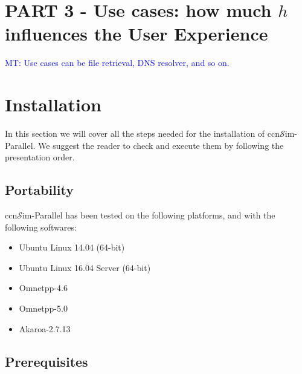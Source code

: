 \documentclass[10pt]{article}
\newcommand{\MT}[1]{\textcolor{blue}{MT: #1}}
\newcommand{\ccnsim}{ccn\ensuremath{\mathcal{S}}im} %
\begin{document}
\section*{PART 3 - Use cases: how much $h$ influences the User Experience}
\MT{Use cases can be file retrieval, DNS resolver, and so on.}

\section*{Installation}
In this section we will cover all the steps needed for the installation of \ccnsim-Parallel. We suggest the reader to check and execute them by following the presentation order.

\subsection*{Portability}

\ccnsim-Parallel has been tested on the following platforms, and with the following softwares:
\begin{itemize}
     \item Ubuntu Linux 14.04 (64-bit)
     \item Ubuntu Linux 16.04 Server (64-bit)
     \item Omnetpp-4.6 
     \item Omnetpp-5.0 
     \item Akaroa-2.7.13 
\end{itemize}

\subsection*{Prerequisites}
\end{document}
